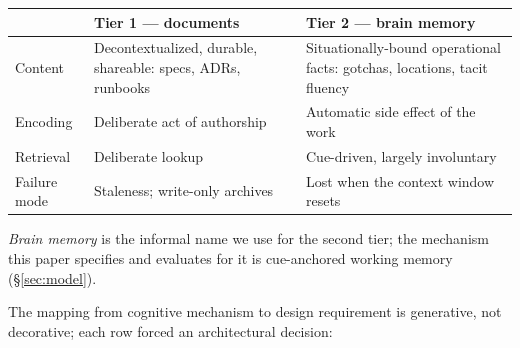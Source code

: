 \documentclass[11pt]{article}
\begin{document}
\begin{table}[h]
\centering
\small
\begin{tabularx}{\textwidth}{@{}p{2.2cm}YY@{}}
\toprule
 & \textbf{Tier 1 --- documents} & \textbf{Tier 2 --- brain memory} \\
\midrule
Content & Decontextualized, durable, shareable: specs, ADRs, runbooks & Situationally-bound operational facts: gotchas, locations, tacit fluency \\
Encoding & Deliberate act of authorship & Automatic side effect of the work \\
Retrieval & Deliberate lookup & Cue-driven, largely involuntary \\
Failure mode & Staleness; write-only archives & Lost when the context window resets \\
\bottomrule
\end{tabularx}
\end{table}

\emph{Brain memory} is the informal name we use for the second tier; the
mechanism this paper specifies and evaluates for it is cue-anchored
working memory (\S\ref{sec:model}).

The mapping from cognitive mechanism to design requirement is generative,
not decorative; each row forced an architectural decision:
\end{document}
